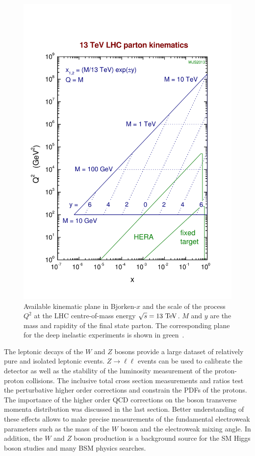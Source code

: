 \begin{figure}[h]
\centering
\includegraphics[width=0.49\columnwidth]{figures_chapter2/lhcgrid13}
\caption{Available kinematic plane in Bjorken-$x$ and the scale of the process $Q^2$ at the LHC centre-of-mass energy $\sqrt{s}=13~\mathrm{Te\kern -0.1em V}$. $M$ and $y$ are the mass and rapidity of the final state parton. The corresponding plane for the deep inelastic experiments is shown in green~\cite{sterling}. }
\label{fig:lhc_grid}
\end{figure} 

The leptonic decays of the $W$ and $Z$ bosons provide a large dataset of relatively pure and isolated leptonic events. $Z \rightarrow \ell \ell$ events can be used to calibrate the detector as well as the stability of the luminosity measurement of the proton-proton collisions. The inclusive total cross section measurements and ratios test the perturbative higher order corrections and constrain the PDFs of the protons. The importance of the higher order QCD corrections on the boson transverse momenta distribution was discussed in the last section. Better understanding of these effects allows to make precise measurements of the fundamental electroweak parameters such as the mass of the $W$ boson and the electroweak mixing angle. In addition, the $W$ and $Z$ boson production is a background source for the SM Higgs boson studies and many BSM physics searches.

